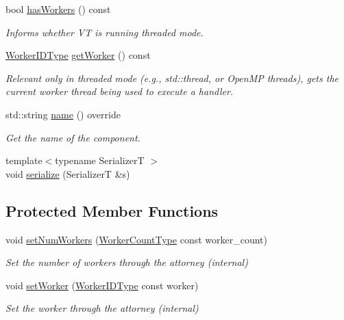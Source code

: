 \begin{DoxyCompactItemize}
bool \hyperlink{structvt_1_1ctx_1_1_context_a17b1fd9fd7bfc2afdd55707d1f321f76}{has\+Workers} () const
\begin{DoxyCompactList}\small\item\em Informs whether VT is running threaded mode. \end{DoxyCompactList}\item 
\hyperlink{namespacevt_a656e362091da17b9b93d0655b36e3392}{Worker\+I\+D\+Type} \hyperlink{structvt_1_1ctx_1_1_context_a1e39e0561109fd30b45a427ddb055cd2}{get\+Worker} () const
\begin{DoxyCompactList}\small\item\em Relevant only in threaded mode (e.\+g., {\ttfamily std\+::thread}, or Open\+MP threads), gets the current worker thread being used to execute a handler. \end{DoxyCompactList}\item 
std\+::string \hyperlink{structvt_1_1ctx_1_1_context_a6bef35c171d45feb409d7b6aa6168996}{name} () override
\begin{DoxyCompactList}\small\item\em Get the name of the component. \end{DoxyCompactList}\item 
{\footnotesize template$<$typename SerializerT $>$ }\\void \hyperlink{structvt_1_1ctx_1_1_context_a510b7a30a4e10b95528a8a9c2306a075}{serialize} (SerializerT \&s)
\end{DoxyCompactItemize}
\subsection*{Protected Member Functions}
\begin{DoxyCompactItemize}
\item 
void \hyperlink{structvt_1_1ctx_1_1_context_afc4549ac9cdae67301613613b9381d1c}{set\+Num\+Workers} (\hyperlink{namespacevt_aa93398ea48f2cb6c188512250f7cc248}{Worker\+Count\+Type} const worker\+\_\+count)
\begin{DoxyCompactList}\small\item\em Set the number of workers through the attorney (internal) \end{DoxyCompactList}\item 
void \hyperlink{structvt_1_1ctx_1_1_context_a32f62f26b7a6977c91186f8c2aa2b16a}{set\+Worker} (\hyperlink{namespacevt_a656e362091da17b9b93d0655b36e3392}{Worker\+I\+D\+Type} const worker)
\begin{DoxyCompactList}\small\item\em Set the worker through the attorney (internal) \end{DoxyCompactList}\end{DoxyCompactItemize}
